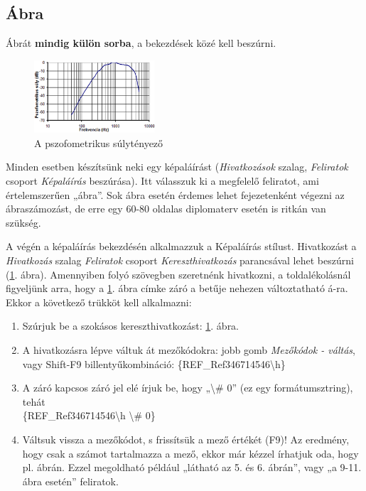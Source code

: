 \documentclass[a4paper, 12pt]{article}
\begin{document}
	\subsection{Ábra}
	Ábrát \textbf{mindig külön sorba}, a bekezdések közé kell beszúrni.
	\begin{figure}[h]
		\centering
		\includegraphics[width=0.4\textwidth]{frekvencia.png}
		\caption{A pszofometrikus súlytényező}
		\label{fig:frek}
	\end{figure}

	Minden esetben készítsünk neki egy képaláírást (\textit{\textcolor{bme}{Hivatkozások}} szalag, \textit{\textcolor{bme}{Feliratok}} csoport \textit{\textcolor{bme}{Képaláírás}} beszúrása).
	Itt válasszuk ki a megfelelő feliratot, ami értelemszerűen „ábra”.
	Sok ábra esetén érdemes lehet fejezetenként végezni az ábraszámozást, de erre egy 60-80 oldalas diplomaterv esetén is ritkán van szükség.
	\par
	A végén a képaláírás bekezdésén alkalmazzuk a Képaláírás stílust.
	Hivatkozást a \textit{\textcolor{bme}{Hivatkozás}} szalag \textit{\textcolor{bme}{Feliratok}} csoport \textit{\textcolor{bme}{Kereszthivatkozás}} parancsával lehet beszúrni (\ref{fig:frek}. ábra).
	Amennyiben folyó szövegben szeretnénk hivatkozni, a toldalékolásnál figyeljünk arra, hogy a \ref{fig:frek}. ábra címke záró a betűje nehezen változtatható á-ra.
	Ekkor a következő trükköt kell alkalmazni:
	\begin{enumerate}
		\item Szúrjuk be a szokásos kereszthivatkozást: \ref{fig:frek}. ábra.
		\item A hivatkozásra lépve váltuk át mezőkódokra: jobb gomb \textit{\textcolor{bme}{Mezőkódok - váltás}}, vagy Shift-F9 billentyűkombináció: \{REF\_Ref346714546\textbackslash h\}
		\item A záró kapcsos záró jel elé írjuk be, hogy „\textbackslash\# 0” (ez egy formátumsztring), tehát \\ \{REF\_Ref346714546\textbackslash h \textbackslash\# 0\}
		\item Váltsuk vissza a mezőkódot, s frissítsük a mező értékét (F9)!
		Az eredmény, hogy csak a számot tartalmazza a mező, ekkor már kézzel írhatjuk oda, hogy pl. ábrán.
		Ezzel megoldható például „látható az 5. és 6. ábrán”, vagy „a 9-11. ábra esetén” feliratok.
	\end{enumerate}
\end{document}
